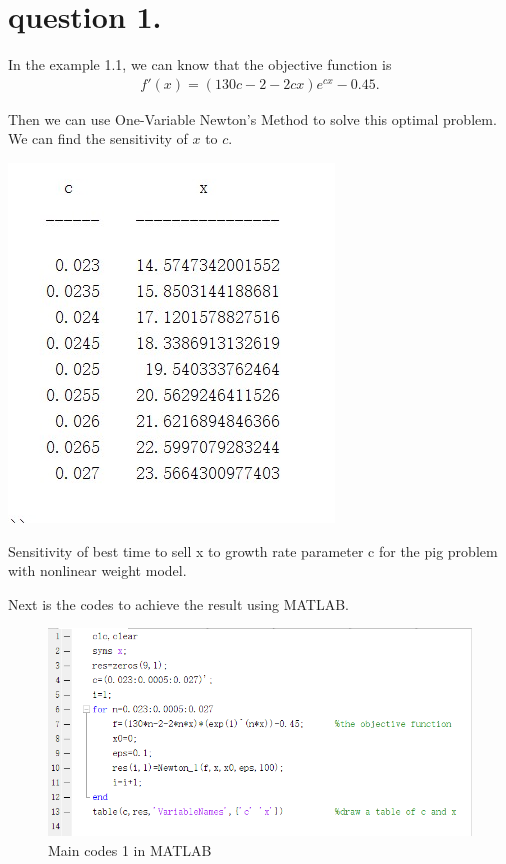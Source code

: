 \documentclass{report}
\begin{document}
\section*{question 1.}
\par In the example 1.1, we can know that the objective function 
is 
\begin{align*}
    f'(x)=(130c-2-2cx)e^{cx}-0.45.
\end{align*}

Then we can use One-Variable Newton's Method to solve this optimal problem. 
We can find the sensitivity of $x$ to $c$.

\begin{table}[htbp]
    \centering
    \includegraphics[scale=0.8]{figs/1_1.jpg}
    \caption{Sensitivity of best time to sell x to growth rate parameter c for the pig problem with nonlinear weight model.}
\end{table}

Next is the codes to achieve the result using MATLAB\@. 

\begin{figure}[htbp]
    \centering
    \includegraphics[scale=0.8]{figs/1_2.jpg}
    \caption{Main codes 1 in MATLAB}
\end{figure}
\end{document}
